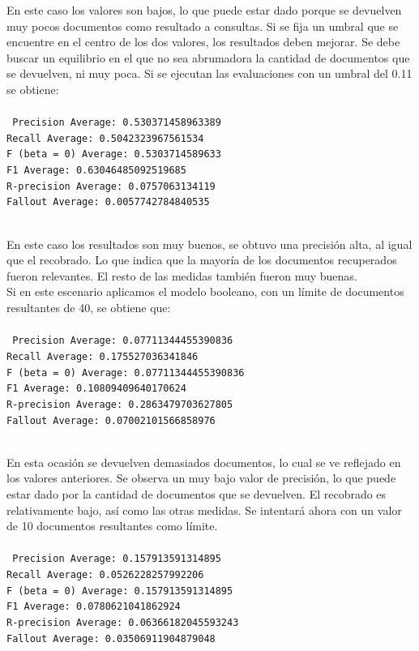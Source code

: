 \documentclass[twoside]{article}
\begin{document}
En este caso los valores son bajos, lo que puede estar dado porque se devuelven muy pocos documentos como resultado a consultas. Si se fija un umbral que se encuentre en el centro de los dos valores, los resultados deben mejorar. Se debe buscar un equilibrio en el que no sea abrumadora la cantidad de documentos que se devuelven, ni muy poca. Si se ejecutan las evaluaciones con un umbral del 0.11 se obtiene:\\\\
\texttt{
Precision Average: 0.530371458963389 \\
Recall Average: 0.5042323967561534 \\
F (beta = 0) Average: 0.5303714589633 \\
F1 Average: 0.63046485092519685 \\
R-precision Average: 0.0757063134119 \\
Fallout Average: 0.0057742784840535 \\\\
}

En este caso los resultados son muy buenos, se obtuvo una precisi\'on alta, al igual que el recobrado. Lo que indica que la mayor\'ia de los documentos recuperados fueron relevantes. El resto de las medidas tambi\'en fueron muy buenas.\\

Si en este escenario aplicamos el modelo booleano, con un l\'imite de documentos resultantes de 40, se obtiene que:\\\\
\texttt{
Precision Average: 0.07711344455390836 \\
Recall Average: 0.175527036341846 \\
F (beta = 0) Average: 0.07711344455390836 \\
F1 Average: 0.10809409640170624 \\
R-precision Average: 0.2863479703627805 \\
Fallout Average: 0.07002101566858976 \\\\
}

En esta ocasi\'on se devuelven demasiados documentos, lo cual se ve reflejado en los valores anteriores. Se observa un muy bajo valor de precisi\'on, lo que puede estar dado por la cantidad de documentos que se devuelven. El recobrado es relativamente bajo, as\'i como las otras medidas. Se intentar\'a ahora con un valor de 10 documentos resultantes como l\'imite.\\\\
\texttt{
Precision Average: 0.157913591314895 \\
Recall Average: 0.0526228257992206 \\
F (beta = 0) Average: 0.157913591314895 \\
F1 Average: 0.0780621041862924 \\
R-precision Average: 0.06366182045593243 \\
Fallout Average: 0.03506911904879048 \\\\
}
\end{document}
